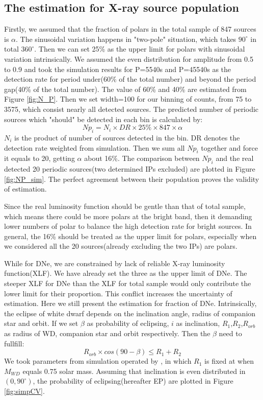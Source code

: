 \documentclass[twoside,twocolumn]{aastex63}
\begin{document}
\subsection{The estimation for X-ray source population}
Firstly, we assumed that the fraction of polars in the total sample of 847 sources is $\alpha$. The sinusoidal variation happens in "two-pole" situation, which takes $90^\circ$ in total $360^\circ$. Then we can set 25\% as the upper limit for polars with sinusoidal variation intrinsically. We assumed the even distribution for amplitude from 0.5 to 0.9 and took the simulation results for P=5540s and P=45540s as the detection rate for period under(60\% of the total number) and beyond the period gap(40\% of the total number). The value of 60\% and 40\% are estimated from Figure \ref{fig:N_P}. Then we set width=100 for our binning of counts, from 75 to 3575, which consist nearly all detected sources. The predicted number of periodic sources which "should" be detected in each bin is calculated by:
\begin{equation}
Np_{i}=N_i\times DR \times 25\% \times 847 \times \alpha	
\end{equation}
$N_i$ is the product of number of sources detected in the bin. DR denotes the detection rate weighted from simulation. Then we sum all $Np_{i}$ together and force it equals to 20,  getting $\alpha$ about 16\%. The comparison between $Np_{i}$ and the real detected 20 periodic sources(two determined IPs excluded) are plotted in Figure \ref{fig:NP_sim}. The perfect agreement between their population proves the validity of estimation.

Since the real luminosity function should be gentle than that of  total sample, which means there could be more polars at the bright band, then it demanding lower numbers of polar to balance the high detection rate for bright sources. 
In general, the 16\% should be treated as the upper limit for polars, especially when we considered all the 20 sources(already excluding the two IPs) are polars. 

While for DNe, we are constrained by lack of reliable X-ray luminosity function(XLF). We have already set the three as the upper limit of DNe. The steeper XLF for DNe than the XLF for total sample would only contribute the lower limit for their proportion. This conflict increases the  uncertainty of estimation. Here we still present the estimation for fraction of DNe.
Intrinsically, the eclipse of white dwarf depends on the inclination angle, radius of companion star and orbit. If we set $\beta$ as probability of eclipsing, $i$ as inclination, $R_1$,$R_2$,$R_{orb}$ as radius of WD, companion star and orbit respectively. Then the $\beta$ need to fullfill:
\begin{equation}
{R_{orb}\times cos(90-\beta)}\leq { R_1+R_2}
\end{equation}
We took parameters from simulation operated by \citep{2011ApJS..194...28K}, in which $R_1$ is fixed at when $M_{WD}$ equals 0.75 solar mass. Assuming that inclination is even distributed in $(0,90^\circ)$, the probability of eclipsing(hereafter EP) are plotted in Figure \ref{fig:simpCV}.
\end{document}
